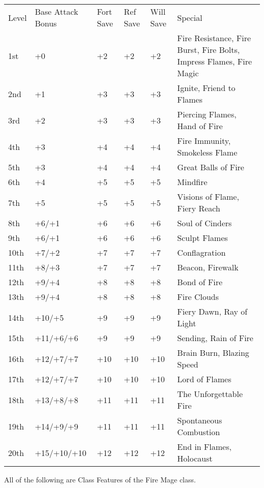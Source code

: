 \begin{table}[htb]
\begin{small}
\begin{tabular}{lp{3cm}p{0.7cm}p{0.7cm}p{0.7cm}l}
Level &Base Attack Bonus &Fort Save &Ref Save &Will Save &Special\\
1st  &+0          &+2  &+2  &+2  &Fire Resistance, Fire Burst, Fire Bolts, Impress Flames, Fire Magic\\
2nd  &+1          &+3  &+3  &+3  &Ignite, Friend to Flames\\
3rd  &+2          &+3  &+3  &+3  &Piercing Flames, Hand of Fire\\
4th  &+3          &+4  &+4  &+4  &Fire Immunity, Smokeless Flame\\
5th  &+3          &+4  &+4  &+4  &Great Balls of Fire\\
6th  &+4          &+5  &+5  &+5  &Mindfire\\
7th  &+5          &+5  &+5  &+5  &Visions of Flame, Fiery Reach\\
8th  &+6/+1       &+6  &+6  &+6  &Soul of Cinders\\
9th  &+6/+1       &+6  &+6  &+6  &Sculpt Flames\\
10th &+7/+2       &+7  &+7  &+7  &Conflagration\\
11th &+8/+3       &+7  &+7  &+7  &Beacon, Firewalk\\
12th &+9/+4       &+8  &+8  &+8  &Bond of Fire\\
13th &+9/+4       &+8  &+8  &+8  &Fire Clouds\\
14th &+10/+5      &+9  &+9  &+9  &Fiery Dawn, Ray of Light\\
15th &+11/+6/+6   &+9  &+9  &+9  &Sending, Rain of Fire\\
16th &+12/+7/+7   &+10 &+10 &+10 &Brain Burn, Blazing Speed\\
17th &+12/+7/+7   &+10 &+10 &+10 &Lord of Flames\\
18th &+13/+8/+8   &+11 &+11 &+11 &The Unforgettable Fire\\
19th &+14/+9/+9   &+11 &+11 &+11 &Spontaneous Combustion\\
20th &+15/+10/+10 &+12 &+12 &+12 &End in Flames, Holocaust
\end{tabular}
\end{small}
\end{table}

\smallskip\noindent All of the following are Class Features of the Fire Mage class.


